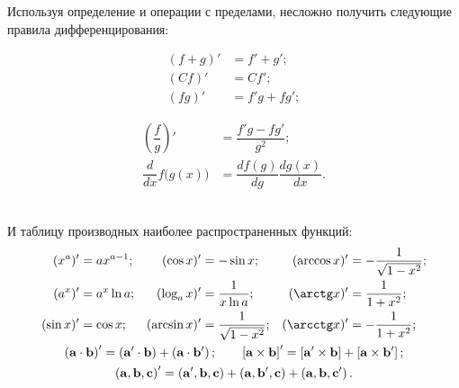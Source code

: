 Используя определение и операции с пределами, несложно получить следующие правила дифференцирования:\\[-0.5pc]
\begin{minipage}{0.5\textwidth}
    \begin{align*}
        (f+g)' &= f' + g';\\
        (Cf)' &= Cf';\\
        (fg)' &= f' g + f g';
    \end{align*}
\end{minipage}
\begin{minipage}{0.5\textwidth}
    \begin{align*}
        \left(\dfrac{f}{g}\right)' &= \dfrac{f' g - f g'}{g^2};\\
        \dfrac{d}{dx}f\bigl(g(x)\bigr) &= \dfrac{df(g)}{dg}\dfrac{dg(x)}{dx}.
    \end{align*}
\end{minipage}\\[0.5pc]
И таблицу производных наиболее распространенных функций:
\begin{gather*}
    \begin{aligned}
       (x^a)' &= a x^{a-1};
       & (\cos x)' &= - \sin x;
       & (\arccos x)' &= - \dfrac{1}{\sqrt{1 - x^2}};\\
       (a^x)' &= a^x \ln a;
       & (\log_a x)' &= \dfrac{1}{x \ln a};
       & (\arctg x)' &= \dfrac{1}{1 + x^2};\\
       (\sin x)' &= \cos x;
       & (\arcsin x)' &= \dfrac{1}{\sqrt{1 - x^2}};
       &  (\arcctg x)' &= - \dfrac{1}{1 + x^2};\\
    \end{aligned}\\
    \scalar{a}{b}' = \scalar{a'}{b} + \scalar{a}{b'};\qquad
    \cross{a}{b}' = \cross{a'}{b} + \cross{a}{b'}; \\
    \triple{a}{b}{c}' = \triple{a'}{b}{c} + \triple{a}{b'}{c} + \triple{a}{b}{c'}.
\end{gather*}
